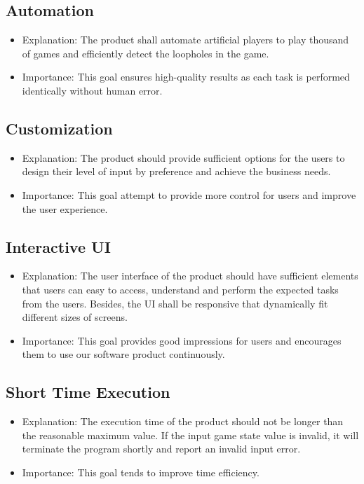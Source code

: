 \documentclass{article}
\begin{document}
\subsection{Automation}
\begin{itemize}
\item Explanation: The product shall automate artificial players to play thousand of games and efficiently detect the loopholes in the game.

\item Importance: This goal ensures high-quality results as each task is performed identically without human error. 
\end{itemize}

\subsection{Customization}
\begin{itemize}
\item Explanation: The product should provide sufficient options for the users to design their level of input by preference and achieve the business needs. 
\item Importance: This goal attempt to provide more control for users and improve the user experience. 
\end{itemize}

\subsection{Interactive UI}
\begin{itemize}
\item Explanation: The user interface of the product should have sufficient elements that users can easy to access, understand and perform the expected tasks from the users. Besides, the UI shall be responsive that dynamically fit different sizes of screens. 
\item Importance: This goal provides good impressions for users and encourages them to use our software product continuously. 
\end{itemize}

\subsection{Short Time Execution}
\begin{itemize}
\item Explanation: The execution time of the product should not be longer than the reasonable maximum value. If the input game state value is invalid, it will terminate the program shortly and report an invalid input error.
\item Importance: This goal tends to improve time efficiency. 
\end{itemize}
\end{document}
